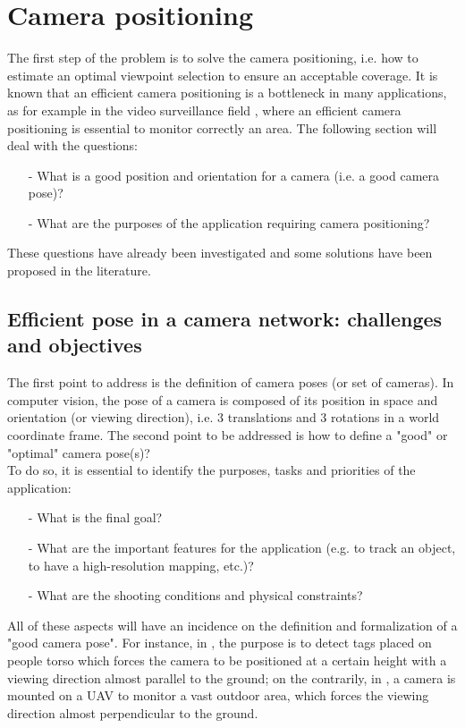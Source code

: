 \section{Camera positioning }\label{sec:camerasPositioning}

The first step of the problem  is to solve  the camera positioning, i.e. how to estimate an optimal viewpoint selection to ensure an acceptable coverage. It is known that an efficient camera positioning is a bottleneck in many applications, as for example in the video surveillance field \cite{11*herrera2012,12*soto2009,18*ding2012,151*zhao2013,84*xu2011}, where an efficient camera positioning is essential to monitor correctly an area.  
The following section will deal with the questions: 
\begin{itemize}
\item[-]What is a good position and orientation for a camera (i.e. a good camera pose)?
\item[-]What are the purposes of the application requiring camera positioning?

\end{itemize}
These questions have already been investigated and some solutions have been proposed in the literature. 


\subsection{Efficient pose in a camera network: challenges and objectives}
The first point to address is the definition of camera poses (or set of cameras). In computer vision, the pose of a camera is composed of its position in space and orientation (or viewing direction), i.e. 3 translations and 3 rotations in a world coordinate frame. The second point to be addressed is how to define a "good" or "optimal" camera pose(s)?\\
 To do so, it is essential to identify the purposes, tasks and priorities of the application: 
 \begin{itemize}
 \item [-] What is the final goal?
 \item [-] What are the important features for the application (e.g. to track an object, to have a high-resolution mapping, etc.)?
 \item [-] What are the shooting conditions and physical constraints?
 \end{itemize}
   All of these aspects will have an incidence on the definition and formalization of a "good camera pose". For instance, in \cite{22*zhao2008}, the purpose is to detect tags placed on people torso which forces the camera to be positioned at a certain height with a viewing direction almost parallel to the ground; on the contrarily, in \cite{146*li2011}, a camera is mounted on a UAV to monitor a vast outdoor area, which forces the viewing direction almost perpendicular to the ground. 

